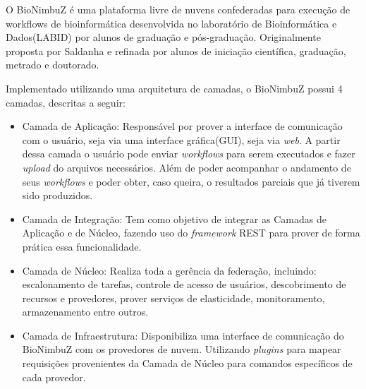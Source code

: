 O BioNimbuZ é uma plataforma livre de nuvens confederadas para execução de workflows de bioinformática desenvolvida no laboratório de Bioinformática e Dados(LABID) por alunos de graduação e pós-graduação. Originalmente proposta por Saldanha\cite{Saldanha_BioNimbus} e refinada por alunos de iniciação científica, graduação, metrado e doutorado.\cite{closer12_BioNimbuZ_AHP}\cite{BioNimbuZ_6846526} \cite{6732620_BioNimbuZ_ACOsched}\cite{BioNimbuZ_Breno_Deric}\cite{BioNimbuZ_Vegara}\cite{BioNimbuZ_Willian_C99}

Implementado utilizando uma arquitetura de camadas, o BioNimbuZ possui 4 camadas, descritas a seguir:
\begin{itemize}
	\item Camada de Aplicação: Responsável por prover a interface de comunicação com o usuário, seja via uma interface gráfica(GUI), seja via \textit{web}. A partir dessa camada o usuário pode enviar \textit{workflows} para serem executados e fazer \textit{upload} do arquivos necessários. Além de poder acompanhar o andamento de seus \textit{workflows} e poder obter, caso queira, o resultados parciais que já tiverem sido produzidos. 
	
	\item Camada de Integração: Tem como objetivo de integrar as Camadas de Aplicação e de Núcleo, fazendo uso do \textit{framework} REST para prover de forma prática essa funcionalidade.
	
	\item Camada de Núcleo: Realiza toda a gerência da federação, incluindo: escalonamento de tarefas, controle de acesso de usuários, descobrimento de recursos e provedores, prover serviços de elasticidade, monitoramento, armazenamento entre outros.
	
	\item Camada de Infraestrutura: Disponibiliza uma interface de comunicação do BioNimbuZ com os provedores de nuvem. Utilizando \textit{plugins} para mapear requisições provenientes da Camada de Núcleo para comandos específicos de cada provedor.
\end{itemize}
